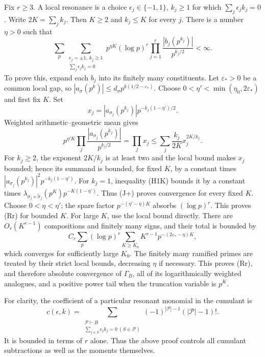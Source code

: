 \documentclass[11pt]{article}
\numberwithin{equation}{section}
\theoremstyle{remark}
\begin{document}
Fix $r\ge3$.  A local resonance is a choice $\epsilon_j\in\{-1,1\}$,
$k_j\ge1$ for which $\sum_j\epsilon_j k_j=0$.  Write
$2K=\sum_jk_j$.  Then $K\ge2$ and $k_j\le K$ for every $j$.
There is a number $\eta>0$ such that
\[
 \sum_p\sum_{\substack{\epsilon_j=\pm1,\ k_j\ge1\\
                  \sum_j\epsilon_jk_j=0}}
 p^{\eta K}(\log p)^r
 \prod_{j=1}^r\frac{|b_j(p^{k_j})|}{p^{k_j/2}}<\infty. \tag{Rr}
\]
To prove this, expand each $b_j$ into its finitely many constituents.
Let $\varepsilon_*>0$ be a common local gap, so
$|a_\sigma(p^k)|\le d_\sigma p^{k(1/2-\varepsilon_*)}$.
Choose $0<\eta'<\min(\eta_0,2\varepsilon_*)$ and first fix $K$.
Set
\[
 x_j=|a_{\sigma_j}(p^{k_j})|p^{-k_j(1-\eta')/2}.
\]
Weighted arithmetic--geometric mean gives
\[
 p^{\eta'K}\prod_j\frac{|a_{\sigma_j}(p^{k_j})|}{p^{k_j/2}}
 =\prod_jx_j
 \le\sum_j\frac{k_j}{2K}x_j^{2K/k_j}.
\]
For $k_j\ge2$, the exponent $2K/k_j$ is at least two and the local bound
makes $x_j$ bounded; hence its summand is bounded, for fixed $K$, by a
constant times $|a_{\sigma_j}(p^{k_j})|^2p^{-k_j(1-\eta')}$.
For $k_j=1$, inequality (H1K) bounds it by a constant times
$\lambda_{\sigma_j\times\widetilde\sigma_j}(p^K)p^{-K(1-\eta')}$.
Thus (J+) proves convergence for every fixed $K$.
Choose $0<\eta<\eta'$; the spare factor $p^{-(\eta'-\eta)K}$ absorbs
$(\log p)^r$.  This proves (Rr) for bounded $K$.
For large $K$, use the local bound directly.  There are $O_r(K^{r-1})$
compositions and finitely many signs, and their total is bounded by
\[
 C_r\sum_p(\log p)^r\sum_{K\ge K_0}
 K^{r-1}p^{-(2\varepsilon_*-\eta)K},
\]
which converges for sufficiently large $K_0$.
The finitely many ramified primes are treated by their strict local
bounds, decreasing $\eta$ if necessary.
This proves (Rr), and therefore absolute convergence of $\Gamma_B$,
all of its logarithmically weighted analogues, and a positive power tail
when the truncation variable is $p^K$.

For clarity, the coefficient of a particular resonant monomial in the
cumulant is
\[
 c(\epsilon,k)=
 \sum_{\substack{\mathcal P\vdash B\\
          \sum_{j\in S}\epsilon_j k_j=0\ (S\in\mathcal P)}}
       (-1)^{|\mathcal P|-1}(|\mathcal P|-1)!.
\]
It is bounded in terms of $r$ alone.  Thus the above proof controls all
cumulant subtractions as well as the moments themselves.
\end{document}
